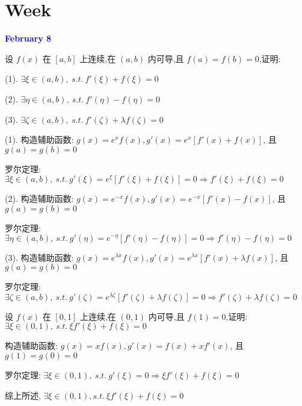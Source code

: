 \section{Week }
\textcolor{blue}{\textbf{February 8}}

\begin{example}[][Exam: 28.2.1]
	设 $f(x)$ 在 $[a,b]$ 上连续,在 $(a,b)$ 内可导,且 $f(a)=f(b)=0$,证明:

(1). $\exists \xi\in(a,b),\ s.t.\ f'(\xi)+f(\xi)=0$

(2). $\exists \eta\in(a,b),\ s.t.\ f'(\eta)-f(\eta)=0$

(3). $\exists \zeta\in(a,b),\ s.t.\ f'(\zeta)+\lambda f(\zeta)=0$
\end{example}

\begin{solution}

	(1). 构造辅助函数: $g(x) = e^{x}f(x), g'(x) = e^{x}\left[f'(x) + f(x)\right]$, 且 $g(a) = g(b) = 0$

	罗尔定理: $\exists \xi\in(a,b),\ s.t.\ g'(\xi) = e^{\xi}\left[f'(\xi) + f(\xi)\right] = 0\Rightarrow f'(\xi) + f(\xi) = 0$

	

	(2). 构造辅助函数: $g(x) = e^{-x}f(x), g'(x) = e^{-x}\left[f'(x) - f(x)\right]$, 且 $g(a) = g(b) = 0$

	罗尔定理: $\exists \eta\in(a,b),\ s.t.\ g'(\eta) = e^{-\eta}\left[f'(\eta) - f(\eta)\right] = 0\Rightarrow f'(\eta) - f(\eta) = 0$

	

	(3). 构造辅助函数: $g(x) = e^{\lambda x}f(x), g'(x) = e^{\lambda x}\left[f'(x) + \lambda f(x)\right]$, 且 $g(a) = g(b) = 0$

	罗尔定理: $\exists \zeta\in(a,b),\ s.t.\ g'(\zeta) = e^{\lambda\zeta}\left[f'(\zeta) + \lambda f(\zeta)\right] = 0\Rightarrow f'(\zeta) + \lambda f(\zeta) = 0$
\end{solution}

\begin{example}[][Exam: 28.2.2]
	设 $f(x)$ 在 $[0,1]$ 上连续,在 $(0,1)$ 内可导,且 $f(1)=0$,证明:$\exists \xi\in(0,1),\ s.t.\ \xi f'(\xi) + f(\xi) = 0$
\end{example}

\begin{solution}

	构造辅助函数: $g(x) = xf(x), g'(x) = f(x) +xf'(x)$, 且 $g(1) = g(0) = 0$

	罗尔定理: $\exists \xi\in(0,1),\ s.t.\ g'(\xi) = 0\Rightarrow \xi f'(\xi) + f(\xi) = 0$

	综上所述, $\exists \xi\in(0,1),s.t.\ \xi f'(\xi) + f(\xi) = 0$
\end{solution}

